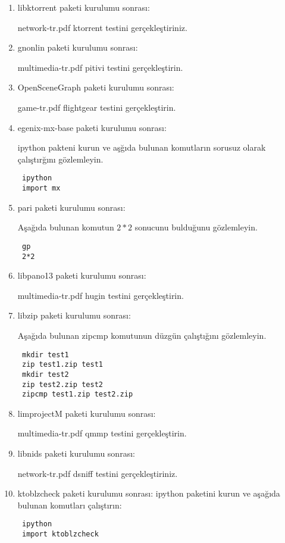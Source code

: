 \documentclass[a4paper,10pt]{article}
\begin{document}
\begin{enumerate}
\item libktorrent paketi kurulumu sonrası:

network-tr.pdf ktorrent testini gerçekleştiriniz.

\item gnonlin paketi kurulumu sonrası:

multimedia-tr.pdf pitivi testini gerçekleştirin.

\item OpenSceneGraph paketi kurulumu sonrası:

game-tr.pdf flightgear testini gerçekleştirin.

\item egenix-mx-base paketi kurulumu sonrası:

ipython pakteni kurun ve aşğıda bulunan komutların sorusuz olarak çalıştırğını gözlemleyin.

\begin{verbatim}
 ipython
 import mx
\end{verbatim}


\item pari paketi kurulumu sonrası:

Aşağıda bulunan komutun $2*2$ sonucunu bulduğunu gözlemleyin.
\begin{verbatim}
 gp 
 2*2
\end{verbatim}

\item libpano13 paketi kurulumu sonrası:
  
multimedia-tr.pdf hugin testini gerçekleştirin.

\item libzip paketi kurulumu sonrası:

Aşağıda bulunan zipcmp komutunun düzgün çalıştığını gözlemleyin.
\begin{verbatim}
 mkdir test1
 zip test1.zip test1
 mkdir test2
 zip test2.zip test2
 zipcmp test1.zip test2.zip
\end{verbatim}

\item limprojectM paketi kurulumu sonrası:
  
multimedia-tr.pdf qmmp testini gerçekleştirin.

\item libnids paketi kurulumu sonrası:

network-tr.pdf dsniff testini gerçekleştiriniz.

\item ktoblzcheck paketi kurulumu sonrası:
ipython paketini kurun ve aşağıda bulunan komutları çalıştırın:
\begin{verbatim}
 ipython
 import ktoblzcheck
\end{verbatim}



\end{enumerate}
\end{document}
